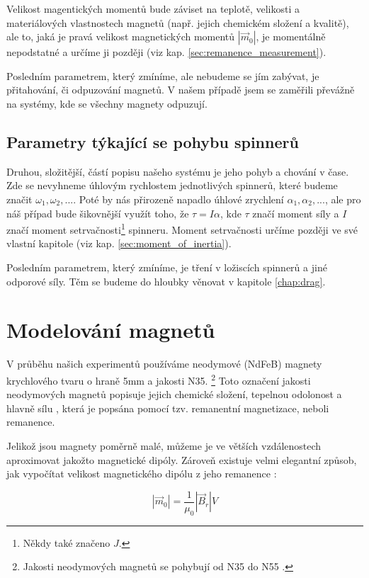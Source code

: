 \documentclass[12pt, a4paper,
 twoside,        %
 openright
]{report}
\begin{document}
Velikost magentických momentů bude záviset na teplotě, velikosti a materiálových vlastnostech magnetů (např. jejich chemickém složení a kvalitě), ale to, jaká je pravá velikost magnetických momentů $|\vec{m}_0|$, je momentálně nepodstatné a určíme ji později (viz kap. \ref{sec:remanence_measurement}).

Posledním parametrem, který zmíníme, ale nebudeme se jím zabývat, je přitahování, či odpuzování magnetů.
V našem případě jsem se zaměřili převážně na systémy, kde se všechny magnety odpuzují.

\subsection{Parametry týkající se pohybu spinnerů}
\label{sub:param_move}

Druhou, složitější, částí popisu našeho systému je jeho pohyb a chování v čase.
Zde se nevyhneme úhlovým rychlostem jednotlivých spinnerů, které budeme značit $\omega_1, \omega_2,...$.
Poté by nás přirozeně napadlo úhlové zrychlení $\alpha_1, \alpha_2, ...$, ale pro náš případ bude šikovnější využít toho, že $\tau = I\alpha$, kde $\tau$ značí moment síly a $I$ značí moment setrvačnosti\footnote{Někdy také značeno $J$.} spinneru.
Moment setrvačnosti určíme později ve své vlastní kapitole (viz kap. \ref{sec:moment_of_inertia}).

Posledním parametrem, který zmíníme, je tření v ložiscích spinnerů a jiné odporové síly.
Těm se budeme do hloubky věnovat v kapitole \ref{chap:drag}.

\clearpage

\section{Modelování magnetů}
V průběhu našich experimentů používáme neodymové (NdFeB) magnety krychlového tvaru o hraně 5mm a jakosti N35. \footnote{Jakosti neodymových magnetů se pohybují od N35 do N55 \cite{magnet_grades}.}
Toto označení jakosti neodymových magnetů popisuje jejich chemické složení, tepelnou odolonost a hlavně sílu \cite{magnet_grades}, která je popsána pomocí tzv. remanentní magnetizace, neboli remanence.

Jelikož jsou magnety poměrně malé, můžeme je ve větších vzdálenostech aproximovat jakožto magnetické dipóly.
Zároveň existuje velmi elegantní způsob, jak vypočítat velikost magnetického dipólu z jeho remanence \cite{magnetic_torque}:

\begin{equation}
    \label{eq:mag_mom_remanence}
    |\vec{m}_0| = \frac{1}{\mu_0}|\vec{B}_r|V
\end{equation}
\end{document}
